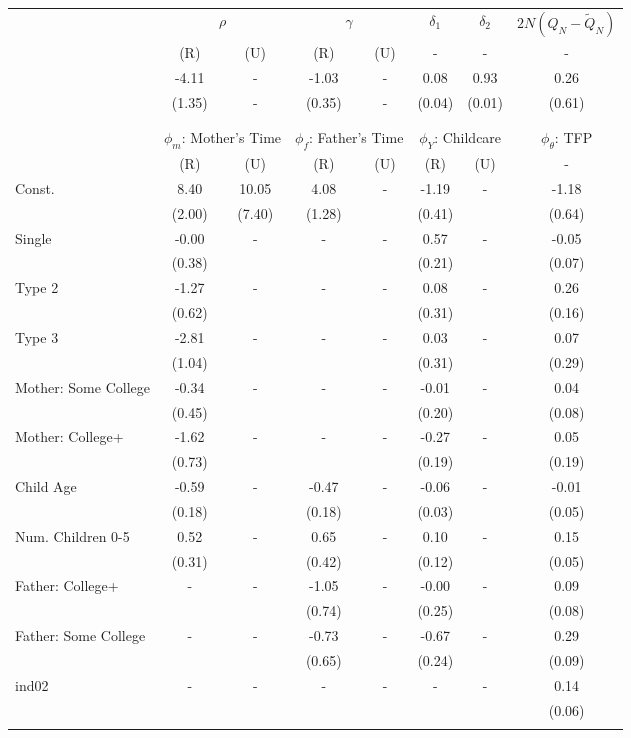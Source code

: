 \begin{tabular}{lccccccc}\toprule
 & \multicolumn{2}{c}{$\rho$} & \multicolumn{2}{c}{$\gamma$} & {$\delta_{1}$} & {$\delta_{2}$} & $2N(Q_{N} - \tilde{Q}_{N})$ \\
 & (R) & (U) & (R) & (U) & - & - & - \\\cmidrule(r){2-3}\cmidrule(r){4-5}\cmidrule(r){6-6}\cmidrule(r){7-7}\cmidrule(r){8-8}
&-4.11& - &-1.03& - &0.08&0.93&0.26\\
&(1.35)& - &(0.35)& - &(0.04)&(0.01)&(0.61)\\
\\
&&&&&&&\\
 & \multicolumn{2}{c}{$\phi_{m}$: Mother's Time} & \multicolumn{2}{c}{$\phi_{f}$: Father's Time} & \multicolumn{2}{c}{$\phi_{Y}$: Childcare} &{$\phi_{\theta}$: TFP} \\
 & (R) & (U) & (R) & (U) & (R) & (U) & -  \\\cmidrule(r){2-3}\cmidrule(r){4-5}\cmidrule(r){6-7}\cmidrule(r){8-8}
Const.&8.40&10.05&4.08& -&-1.19& -&-1.18\\
&(2.00)&(7.40)&(1.28)&&(0.41)&&(0.64)\\
Single&-0.00& -& - & -&0.57& -&-0.05\\
&(0.38)& & &&(0.21)&&(0.07)\\
Type 2&-1.27& -& - & -&0.08& -&0.26\\
&(0.62)& & &&(0.31)&&(0.16)\\
Type 3&-2.81& -& - & -&0.03& -&0.07\\
&(1.04)& & &&(0.31)&&(0.29)\\
Mother: Some College&-0.34& -& - & -&-0.01& -&0.04\\
&(0.45)& & &&(0.20)&&(0.08)\\
Mother: College+&-1.62& -& - & -&-0.27& -&0.05\\
&(0.73)& & &&(0.19)&&(0.19)\\
Child Age&-0.59& -&-0.47& -&-0.06& -&-0.01\\
&(0.18)&&(0.18)&&(0.03)&&(0.05)\\
Num. Children 0-5&0.52& -&0.65& -&0.10& -&0.15\\
&(0.31)&&(0.42)&&(0.12)&&(0.05)\\
Father: College+& - & -&-1.05& -&-0.00& -&0.09\\
 & &&(0.74)&&(0.25)&&(0.08)\\
Father: Some College& - & -&-0.73& -&-0.67& -&0.29\\
 & &&(0.65)&&(0.24)&&(0.09)\\
ind02& - & -& - & -& - & -&0.14\\
 & & & & & &&(0.06)\\
\\
\bottomrule\end{tabular}